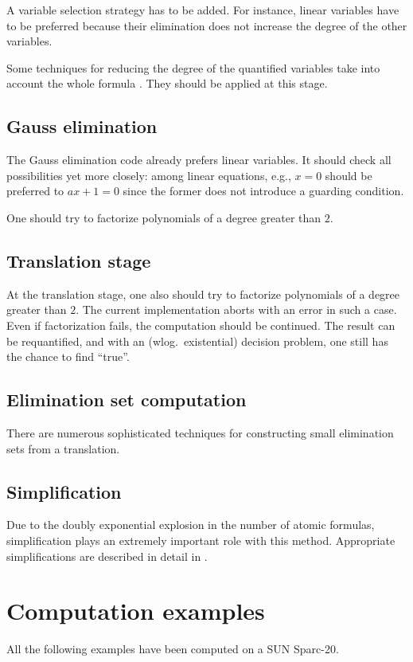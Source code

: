 A variable selection strategy has to be added. For instance, linear
variables have to be preferred because their elimination does not
increase the degree of the other variables.

Some techniques for reducing the degree of the quantified variables
take into account the whole formula \cite{DSW:96}. They should be
applied at this stage.
%
\subsection{Gauss elimination}
The Gauss elimination code already prefers linear variables. It should
check all possibilities yet more closely: among linear equations,
e.g., $x=0$ should be preferred to $ax+1=0$ since the former does not
introduce a guarding condition.

One should try to factorize polynomials of a degree greater than $2$.
%
\subsection{Translation stage}
At the translation stage, one also should try to factorize polynomials
of a degree greater than $2$. The current implementation aborts with
an error in such a case. Even if factorization fails, the computation
should be continued. The result can be requantified, and with an
(wlog.~existential) decision problem, one still has the chance to find
``true''.
%
\subsection{Elimination set computation}
There are numerous sophisticated techniques for constructing small
elimination sets from a translation.
%
\subsection{Simplification}
Due to the doubly exponential explosion in the number of atomic
formulas, simplification plays an extremely important role with this
method. Appropriate simplifications are described in detail in
\cite{DolzmannSturm:95}.
%
\section{Computation examples}
All the following examples have been computed on a SUN Sparc-20.
